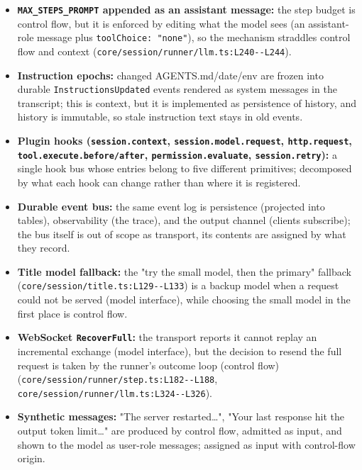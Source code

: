 \begin{itemize}
\item \textbf{\texttt{MAX\_\allowbreak{}STEPS\_\allowbreak{}PROMPT} appended as an assistant message:} the step budget is control flow, but it is enforced by editing what the model sees (an assistant-role message plus \texttt{toolChoice:\allowbreak{} "none"}), so the mechanism straddles control flow and context (\texttt{core/\allowbreak{}session/\allowbreak{}runner/\allowbreak{}llm.\allowbreak{}ts:\allowbreak{}L240-\allowbreak{}-\allowbreak{}L244}).
\item \textbf{Instruction epochs:} changed AGENTS.md/date/env are frozen into durable \texttt{InstructionsUpdated} events rendered as system messages in the transcript; this is context, but it is implemented as persistence of history, and history is immutable, so stale instruction text stays in old events.
\item \textbf{Plugin hooks (\texttt{session.\allowbreak{}context}, \texttt{session.\allowbreak{}model.\allowbreak{}request}, \texttt{http.\allowbreak{}request}, \texttt{tool.\allowbreak{}execute.\allowbreak{}before/\allowbreak{}after}, \texttt{permission.\allowbreak{}evaluate}, \texttt{session.\allowbreak{}retry}):} a single hook bus whose entries belong to five different primitives; decomposed by what each hook can change rather than where it is registered.
\item \textbf{Durable event bus:} the same event log is persistence (projected into tables), observability (the trace), and the output channel (clients subscribe); the bus itself is out of scope as transport, its contents are assigned by what they record.
\item \textbf{Title model fallback:} the "try the small model, then the primary" fallback (\texttt{core/\allowbreak{}session/\allowbreak{}title.\allowbreak{}ts:\allowbreak{}L129-\allowbreak{}-\allowbreak{}L133}) is a backup model when a request could not be served (model interface), while choosing the small model in the first place is control flow.
\item \textbf{WebSocket \texttt{RecoverFull}:} the transport reports it cannot replay an incremental exchange (model interface), but the decision to resend the full request is taken by the runner's outcome loop (control flow) (\texttt{core/\allowbreak{}session/\allowbreak{}runner/\allowbreak{}step.\allowbreak{}ts:\allowbreak{}L182-\allowbreak{}-\allowbreak{}L188}, \texttt{core/\allowbreak{}session/\allowbreak{}runner/\allowbreak{}llm.\allowbreak{}ts:\allowbreak{}L324-\allowbreak{}-\allowbreak{}L326}).
\item \textbf{Synthetic messages:} "The server restarted\ldots{}", "Your last response hit the output token limit\ldots{}" are produced by control flow, admitted as input, and shown to the model as user-role messages; assigned as input with control-flow origin.
\end{itemize}

